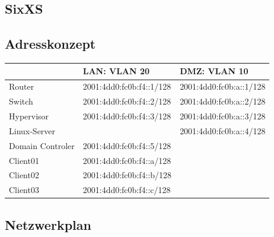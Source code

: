 \subsection{SixXS}

\subsection{Adresskonzept}

\begin{tabular}{|l|l|l|}
\hline
					& LAN: VLAN 20					& DMZ: VLAN 10 \\
\hline
Router				& 2001:4dd0:fc0b:f4::1/128		& 2001:4dd0:fc0b:a::1/128 \\
Switch				& 2001:4dd0:fc0b:f4::2/128		& 2001:4dd0:fc0b:a::2/128 \\
Hypervisor			& 2001:4dd0:fc0b:f4::3/128		& 2001:4dd0:fc0b:a::3/128 \\	
Linux-Server			&								& 2001:4dd0:fc0b:a::4/128 \\
Domain Controler 	& 2001:4dd0:fc0b:f4::5/128		& \\
Client01				& 2001:4dd0:fc0b:f4::a/128		& \\
Client02				& 2001:4dd0:fc0b:f4::b/128		& \\
Client03				& 2001:4dd0:fc0b:f4::c/128		& \\
\hline
\end{tabular}

\subsection{Netzwerkplan}

